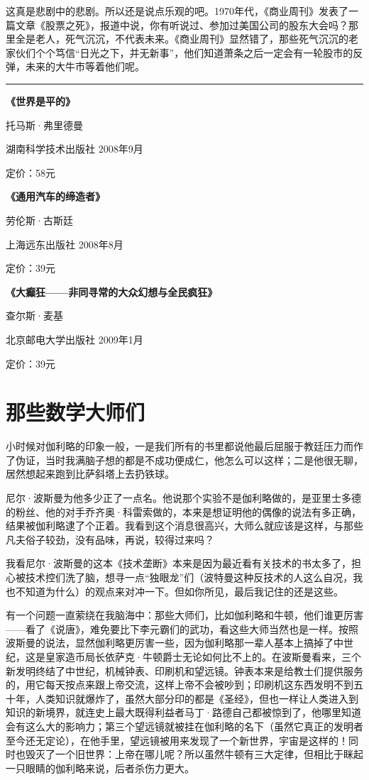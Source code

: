 这真是悲剧中的悲剧。所以还是说点乐观的吧。1970年代，《商业周刊》发表了一篇文章《股票之死》，报道中说，你有听说过、参加过美国公司的股东大会吗？那里全是老人，死气沉沉，不代表未来。《商业周刊》显然错了，那些死气沉沉的老家伙们个个笃信``日光之下，并无新事''，他们知道萧条之后一定会有一轮股市的反弹，未来的大牛市等着他们呢。

\begin{center}\rule{0.5\linewidth}{0.5pt}\end{center}

\textbf{《世界是平的》}

托马斯·弗里德曼

湖南科学技术出版社 2008年9月

定价：58元

\textbf{《通用汽车的缔造者》}

劳伦斯·古斯廷

上海远东出版社 2008年8月

定价：39元

\textbf{《大癫狂------非同寻常的大众幻想与全民疯狂》}

查尔斯·麦基

北京邮电大学出版社 2009年1月

定价：39元

\hypertarget{ux90a3ux4e9bux6570ux5b66ux5927ux5e08ux4eec}{%
\section{那些数学大师们}\label{ux90a3ux4e9bux6570ux5b66ux5927ux5e08ux4eec}}

小时候对伽利略的印象一般，一是我们所有的书里都说他最后屈服于教廷压力而作了伪证，当时我满脑子想的都是不成功便成仁，他怎么可以这样；二是他很无聊，居然想起来跑到比萨斜塔上去扔铁球。

尼尔·波斯曼为他多少正了一点名。他说那个实验不是伽利略做的，是亚里士多德的粉丝、他的对手乔齐奥·科雷索做的，本来是想证明他的偶像的说法有多正确，结果被伽利略逮了个正着。我看到这个消息很高兴，大师么就应该是这样，与那些凡夫俗子较劲，没有品味，再说，较得过来吗？

我看尼尔·波斯曼的这本《技术垄断》本来是因为最近看有关技术的书太多了，担心被技术控们洗了脑，想寻一点``独眼龙''们（波特曼这种反技术的人这么自况，我也不知道为什么）的观点来对冲一下。但如你所见，最后我记住的还是这些。

有一个问题一直萦绕在我脑海中：那些大师们，比如伽利略和牛顿，他们谁更厉害------看了《说唐》，难免要比下李元霸们的武功，看这些大师当然也是一样。按照波斯曼的说法，显然伽利略更厉害一些，因为伽利略那一辈人基本上搞掉了中世纪，这是皇家造币局长依萨克·牛顿爵士无论如何比不上的。在波斯曼看来，三个新发明终结了中世纪，机械钟表、印刷机和望远镜。钟表本来是给教士们提供服务的，用它每天按点来跟上帝交流，这样上帝不会被吵到；印刷机这东西发明不到五十年，人类知识就爆炸了，虽然大部分印的都是《圣经》，但也一样让人类进入到知识的新境界，就连史上最大既得利益者马丁·路德自己都被惊到了，他哪里知道会有这么大的影响力；第三个望远镜就被挂在伽利略的名下（虽然它真正的发明者至今还无定论），在他手里，望远镜被用来发现了一个新世界，宇宙是这样的！同时也毁灭了一个旧世界：上帝在哪儿呢？所以虽然牛顿有三大定律，但相比于眯起一只眼睛的伽利略来说，后者杀伤力更大。

